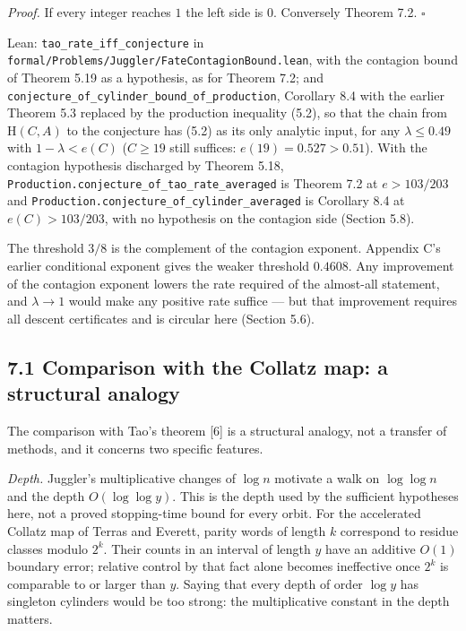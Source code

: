 \documentclass[11pt,a4paper]{article}
\begin{document}
\emph{Proof.} If every integer reaches \(1\) the left side is \(0\).
Conversely Theorem 7.2. \(\square\)

Lean: \texttt{\nolinkurl{tao_rate_iff_conjecture}} in
\texttt{\nolinkurl{formal/Problems/Juggler/FateContagionBound.lean}},
with the contagion bound of Theorem 5.19 as a hypothesis, as for Theorem
7.2; and
\texttt{\nolinkurl{conjecture_of_cylinder_bound_of_production}},
Corollary 8.4 with the earlier Theorem 5.3 replaced by the production
inequality (5.2), so that the chain from \(\mathrm H(C,A)\) to the
conjecture has (5.2) as its only analytic input, for any
\(\lambda\le 0.49\) with \(1-\lambda<e(C)\) (\(C\ge 19\) still suffices:
\(e(19)=0.527>0.51\)). With the contagion hypothesis discharged by
Theorem 5.18,
\texttt{\nolinkurl{Production.conjecture_of_tao_rate_averaged}} is
Theorem 7.2 at \(e>103/203\) and
\texttt{\nolinkurl{Production.conjecture_of_cylinder_averaged}} is
Corollary 8.4 at \(e(C)>103/203\), with no hypothesis on the contagion
side (Section 5.8).

The threshold \(3/8\) is the complement of the contagion exponent.
Appendix C's earlier conditional exponent gives the weaker threshold
\(0.4608\). Any improvement of the contagion exponent lowers the rate
required of the almost-all statement, and \(\lambda\to 1\) would make
any positive rate suffice --- but that improvement requires all descent
certificates and is circular here (Section 5.6).

\subsection{7.1 Comparison with the Collatz map: a structural
analogy}\label{comparison-with-the-collatz-map-a-structural-analogy}

The comparison with Tao's theorem {[}6{]} is a structural analogy, not a
transfer of methods, and it concerns two specific features.

\emph{Depth.} Juggler's multiplicative changes of \(\log n\) motivate a
walk on \(\log\log n\) and the depth \(O(\log\log y)\). This is the
depth used by the sufficient hypotheses here, not a proved stopping-time
bound for every orbit. For the accelerated Collatz map of Terras and
Everett, parity words of length \(k\) correspond to residue classes
modulo \(2^k\). Their counts in an interval of length \(y\) have an
additive \(O(1)\) boundary error; relative control by that fact alone
becomes ineffective once \(2^k\) is comparable to or larger than \(y\).
Saying that every depth of order \(\log y\) has singleton cylinders
would be too strong: the multiplicative constant in the depth matters.
\end{document}
